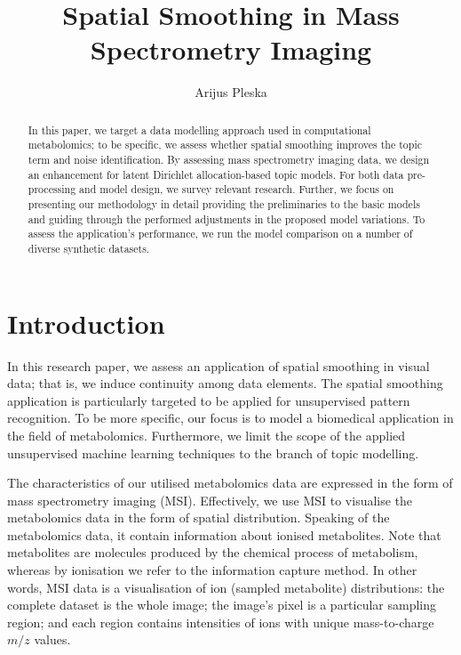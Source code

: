 \documentclass{mpaper}
\begin{document}
\title{Spatial Smoothing in Mass Spectrometry Imaging}
\author{Arijus Pleska}

\maketitle


\begin{abstract}
In this paper, we target a data modelling approach used in computational metabolomics; to be specific, we assess whether spatial smoothing improves the topic term and noise identification. By assessing mass spectrometry imaging data, we design an enhancement for latent Dirichlet allocation-based topic models. For both data pre-processing and model design, we survey relevant research. Further, we focus on presenting our methodology in detail providing the preliminaries to the basic models and guiding through the performed adjustments in the proposed model variations. To assess the application's performance, we run the model comparison on a number of diverse synthetic datasets.
\end{abstract}

\section{Introduction}

\par In this research paper, we assess an application of spatial smoothing in visual data; that is, we induce continuity among data elements. The spatial smoothing application is particularly targeted to be applied for unsupervised pattern recognition. To be more specific, our focus is to model a biomedical application in the field of metabolomics. Furthermore, we limit the scope of the applied unsupervised machine learning techniques to the branch of topic modelling.  

\par The characteristics of our utilised metabolomics data are expressed in the form of mass spectrometry imaging (MSI). Effectively, we use MSI to visualise the metabolomics data in the form of spatial distribution. Speaking of the metabolomics data, it contain information about ionised metabolites. Note that metabolites are molecules produced by the chemical process of metabolism, whereas by ionisation we refer to the information capture method. In other words, MSI data is a visualisation of ion (sampled metabolite) distributions: the complete dataset is the whole image; the image's pixel is a particular sampling region; and each region contains intensities of ions with unique mass-to-charge $m/z$ values. 
\end{document}
